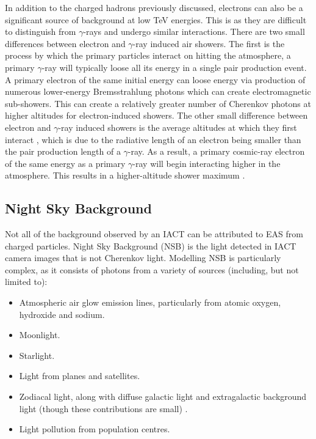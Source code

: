 In addition to the charged hadrons previously discussed, electrons can also be a significant source of background at low TeV energies. This is as they are difficult to distinguish from $\gamma$-rays and undergo similar interactions. There are two small differences between electron and $\gamma$-ray induced air showers. The first is the process by which the primary particles interact on hitting the atmosphere, a primary $\gamma$-ray will typically loose all its energy in a single pair production event. A primary electron of the same initial energy can loose energy via production of numerous lower-energy Bremsstrahlung photons which can create electromagnetic sub-showers. This can create a relatively greater number of Cherenkov photons at higher altitudes for electron-induced showers. The other small difference between electron and $\gamma$-ray induced showers is the average altitudes at which they first interact \cite{Sitarek1i}, which is due to the radiative length of an electron being smaller than the pair production length of a $\gamma$-ray. As a result, a primary cosmic-ray electron of the same energy as a primary $\gamma$-ray will begin interacting higher in the atmosphere. This results in a higher-altitude shower maximum \cite{lypova}. 

\subsection{Night Sky Background}
Not all of the background observed by an IACT can be attributed to EAS from charged particles. Night Sky Background (NSB) is the light detected in IACT camera images that is not Cherenkov light. Modelling NSB is particularly complex, as it consists of photons from a variety of sources (including, but not limited to):

\begin{itemize}
    \item Atmospheric air glow emission lines, particularly from atomic oxygen, hydroxide and sodium.
    \item Moonlight.
    \item Starlight.
    \item Light from planes and satellites.
    \item Zodiacal light, along with diffuse galactic light and extragalactic background light (though these contributions are small) \cite{nsbref}.
    \item Light pollution from population centres.
\end{itemize}

